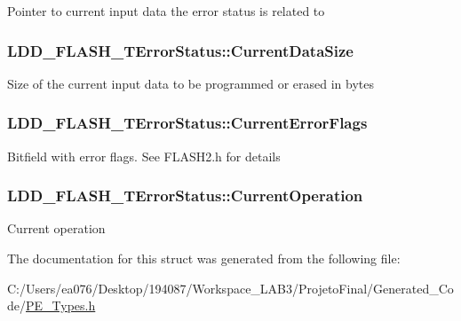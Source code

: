 Pointer to current input data the error status is related to \hypertarget{struct_l_d_d___f_l_a_s_h___t_error_status_ab7c77ef770367308c125aa95c4f0e465}{
\subsubsection[{Current\-Data\-Size}]{ L\-D\-D\-\_\-\-F\-L\-A\-S\-H\-\_\-\-T\-Error\-Status\-::\-Current\-Data\-Size}}\label{struct_l_d_d___f_l_a_s_h___t_error_status_ab7c77ef770367308c125aa95c4f0e465}
Size of the current input data to be programmed or erased in bytes \hypertarget{struct_l_d_d___f_l_a_s_h___t_error_status_a1f8e3f3fd6ceb25960d234254aee7e13}{
\subsubsection[{Current\-Error\-Flags}]{ L\-D\-D\-\_\-\-F\-L\-A\-S\-H\-\_\-\-T\-Error\-Status\-::\-Current\-Error\-Flags}}\label{struct_l_d_d___f_l_a_s_h___t_error_status_a1f8e3f3fd6ceb25960d234254aee7e13}
Bitfield with error flags. See F\-L\-A\-S\-H2.\-h for details \hypertarget{struct_l_d_d___f_l_a_s_h___t_error_status_aa1b99bfba14fdc8379522df15da47e7b}{
\subsubsection[{Current\-Operation}]{ L\-D\-D\-\_\-\-F\-L\-A\-S\-H\-\_\-\-T\-Error\-Status\-::\-Current\-Operation}}\label{struct_l_d_d___f_l_a_s_h___t_error_status_aa1b99bfba14fdc8379522df15da47e7b}
Current operation 

The documentation for this struct was generated from the following file\-:\begin{DoxyCompactItemize}
\item 
C\-:/\-Users/ea076/\-Desktop/194087/\-Workspace\-\_\-\-L\-A\-B3/\-Projeto\-Final/\-Generated\-\_\-\-Code/\hyperlink{_p_e___types_8h}{P\-E\-\_\-\-Types.\-h}\end{DoxyCompactItemize}
